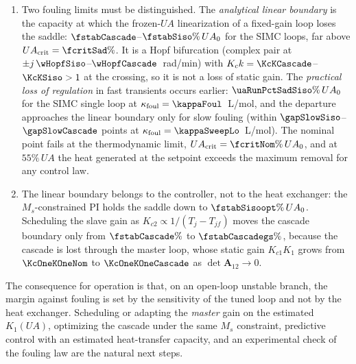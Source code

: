 \begin{enumerate}
    \item Two fouling limits must be distinguished. The \emph{analytical linear boundary} is the capacity at which the frozen-$UA$ linearization of a fixed-gain loop loses the saddle: $\fstabCascade$--$\fstabSiso\%\,UA_0$ for the SIMC loops, far above $UA_{\mathrm{crit}}=\fcritSad\%$. It is a Hopf bifurcation (complex pair at $\pm j\,\wHopfSiso$--$\wHopfCascade$~rad/min) with $K_ck=\KcKCascade$--$\KcKSiso>1$ at the crossing, so it is not a loss of static gain. The \emph{practical loss of regulation} in fast transients occurs earlier: $\uaRunPctSadSiso\%\,UA_0$ for the SIMC single loop at $\kappa_{\mathrm{foul}}=\kappaFoul$~L/mol, and the departure approaches the linear boundary only for slow fouling (within $\gapSlowSiso$--$\gapSlowCascade$ points at $\kappa_{\mathrm{foul}}=\kappaSweepLo$~L/mol). The nominal point fails at the thermodynamic limit, $UA_{\mathrm{crit}}=\fcritNom\%\,UA_0$, and at $55\%\,UA$ the heat generated at the setpoint exceeds the maximum removal for any control law.
    \item The linear boundary belongs to the controller, not to the heat exchanger: the $M_s$-constrained PI holds the saddle down to $\fstabSisoopt\%\,UA_0$. Scheduling the slave gain as $K_{c2}\propto1/(T_j-T_{jf})$ moves the cascade boundary only from $\fstabCascade\%$ to $\fstabCascadegs\%$, because the cascade is lost through the master loop, whose static gain $K_{c1}K_1$ grows from $\KcOneKOneNom$ to $\KcOneKOneCascade$ as $\det\mathbf{A}_{12}\to0$.
\end{enumerate}
The consequence for operation is that, on an open-loop unstable branch, the margin against fouling is set by the sensitivity of the tuned loop and not by the heat exchanger. Scheduling or adapting the \emph{master} gain on the estimated $K_1(UA)$, optimizing the cascade under the same $M_s$ constraint, predictive control with an estimated heat-transfer capacity, and an experimental check of the fouling law are the natural next steps.
